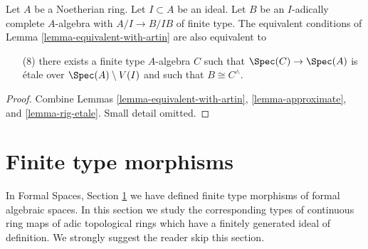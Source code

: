 \begin{lemma}
\label{lemma-approximate-by-etale-over-complement}
Let $A$ be a Noetherian ring. Let $I \subset A$ be an ideal.
Let $B$ be an $I$-adically complete $A$-algebra with $A/I \to B/IB$
of finite type. The equivalent conditions of
Lemma \ref{lemma-equivalent-with-artin} are also equivalent to
\begin{enumerate}
\item[(8)]
\label{item-algebraize}
there exists a finite type $A$-algebra $C$ such that
$\Spec(C) \to \Spec(A)$ is \'etale over $\Spec(A) \setminus V(I)$
and such that $B \cong C^\wedge$.
\end{enumerate}
\end{lemma}

\begin{proof}
Combine Lemmas \ref{lemma-equivalent-with-artin}, \ref{lemma-approximate}, and
\ref{lemma-rig-etale}. Small detail omitted.
\end{proof}




\section{Finite type morphisms}
\label{section-finite-type}

\noindent
In Formal Spaces, Section \ref{section-finite-type}
we have defined finite type morphisms of formal algebraic spaces.
In this section we study the corresponding types of continuous
ring maps of adic topological rings which have a finitely generated
ideal of definition. We strongly suggest the reader skip this section.

